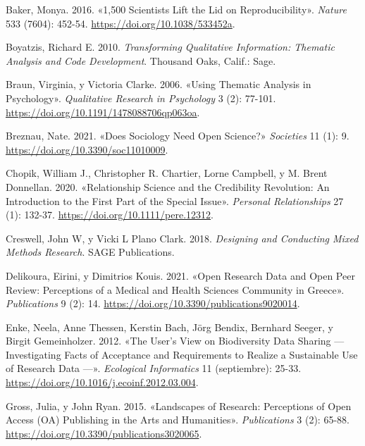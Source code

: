 \documentclass[
  letterpaper,
  DIV=11,
  numbers=noendperiod]{scrreprt}
\newlength{\cslhangindent}
\newlength{\cslentryspacingunit} %
\newenvironment{CSLReferences}[2] %
 {%
  \setlength{\parindent}{0pt}
  \ifodd #1
  \let\oldpar\par
  \def\par{\hangindent=\cslhangindent\oldpar}
  \fi
  \setlength{\parskip}{#2\cslentryspacingunit}
 }%
 {}
\begin{document}
\hypertarget{refs}{}
\begin{CSLReferences}{1}{0}
\leavevmode{}%
Baker, Monya. 2016. {«1,500 Scientists Lift the Lid on
Reproducibility»}. \emph{Nature} 533 (7604): 452-54.
\url{https://doi.org/10.1038/533452a}.

\leavevmode{}%
Boyatzis, Richard E. 2010. \emph{Transforming Qualitative Information:
Thematic Analysis and Code Development}. Thousand Oaks, Calif.: Sage.

\leavevmode{}%
Braun, Virginia, y Victoria Clarke. 2006. {«Using Thematic Analysis in
Psychology»}. \emph{Qualitative Research in Psychology} 3 (2): 77-101.
\url{https://doi.org/10.1191/1478088706qp063oa}.

\leavevmode{}%
Breznau, Nate. 2021. {«Does {Sociology Need Open Science}?»}
\emph{Societies} 11 (1): 9. \url{https://doi.org/10.3390/soc11010009}.

\leavevmode{}%
Chopik, William J., Christopher R. Chartier, Lorne Campbell, y M. Brent
Donnellan. 2020. {«Relationship Science and the Credibility Revolution:
{An} Introduction to the First Part of the Special Issue»}.
\emph{Personal Relationships} 27 (1): 132-37.
\url{https://doi.org/10.1111/pere.12312}.

\leavevmode{}%
Creswell, John W, y Vicki L Plano Clark. 2018. \emph{Designing and
{Conducting Mixed Methods Research}}. SAGE Publications.

\leavevmode{}%
Delikoura, Eirini, y Dimitrios Kouis. 2021. {«Open {Research Data} and
{Open Peer Review}: {Perceptions} of a {Medical} and {Health Sciences
Community} in {Greece}»}. \emph{Publications} 9 (2): 14.
\url{https://doi.org/10.3390/publications9020014}.

\leavevmode{}%
Enke, Neela, Anne Thessen, Kerstin Bach, Jörg Bendix, Bernhard Seeger, y
Birgit Gemeinholzer. 2012. {«The User's View on Biodiversity Data
Sharing --- {Investigating} Facts of Acceptance and Requirements to
Realize a Sustainable Use of Research Data ---»}. \emph{Ecological
Informatics} 11 (septiembre): 25-33.
\url{https://doi.org/10.1016/j.ecoinf.2012.03.004}.

\leavevmode{}%
Gross, Julia, y John Ryan. 2015. {«Landscapes of {Research}:
{Perceptions} of {Open Access} ({OA}) {Publishing} in the {Arts} and
{Humanities}»}. \emph{Publications} 3 (2): 65-88.
\url{https://doi.org/10.3390/publications3020065}.


\end{CSLReferences}
\end{document}
